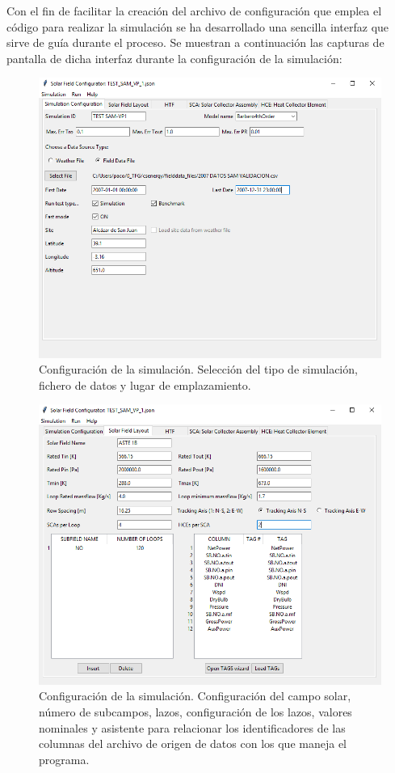 Con el fin de facilitar la creación del archivo de configuración que
emplea el código para realizar la simulación se ha desarrollado una
sencilla interfaz que sirve de guía durante el proceso. Se muestran a
continuación las capturas de pantalla de dicha interfaz durante la
configuración de la simulación:

\begin{figure}
\includegraphics[scale=0.8]{images/interface01.png}
\caption{Configuración de la simulación. Selección del tipo de simulación, fichero de datos y lugar de emplazamiento.} 
\label{fig:interface01}
\end{figure}

\begin{figure}
\includegraphics[scale=0.8]{images/interface02.png}
\caption{Configuración de la simulación. Configuración del campo solar, número de subcampos, lazos, configuración de los lazos, valores nominales y asistente para relacionar los identificadores de las columnas del archivo de origen de datos con los que maneja el programa.} 
\label{fig:interface02}
\end{figure}


